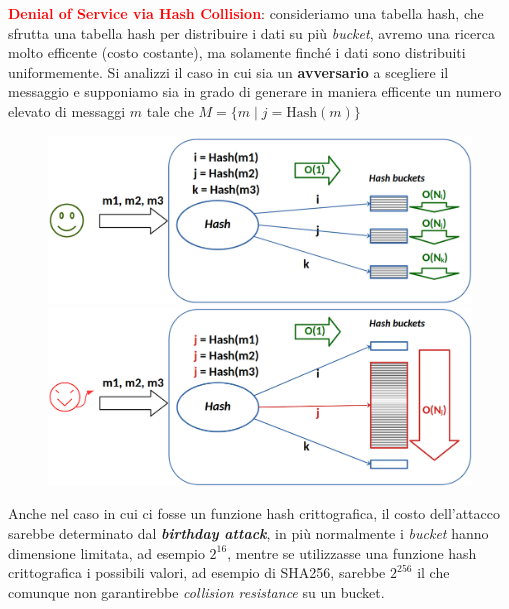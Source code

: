 \begin{flushleft}
    \textcolor{red}{\textbf{Denial of Service via Hash Collision}}: consideriamo una tabella hash, che sfrutta una tabella hash per distribuire i dati su più \textit{bucket}, avremo una ricerca molto efficente (costo costante), ma solamente finché i dati sono distribuiti uniformemente. Si analizzi il caso in cui sia un \textbf{avversario} a scegliere il messaggio e supponiamo sia in grado di generare in maniera efficente un numero elevato di messaggi $m$ tale che $M = \{m \; | \; j = \text{Hash}(m)\}$

    \begin{figure}[h]
        \centering
        \begin{minipage}[t]{0.45\textwidth}
            \centering
            \includegraphics[width=\textwidth]{img/hc_dos.png}
        \end{minipage}
        \hfill
        \begin{minipage}[t]{0.45\textwidth}
            \includegraphics[width=\textwidth]{img/hc_dos_1.png}
            \centering
        \end{minipage}
    \end{figure}
    Anche nel caso in cui ci fosse un funzione hash crittografica, il costo dell'attacco sarebbe determinato dal \textbf{\textit{birthday attack}}, in più normalmente i \textit{bucket} hanno dimensione limitata, ad esempio $2^{16}$, mentre se utilizzasse una funzione hash crittografica i possibili valori, ad esempio di SHA256, sarebbe $2^{256}$ il che comunque non garantirebbe \textit{collision resistance} su un bucket. \\

\end{flushleft}
